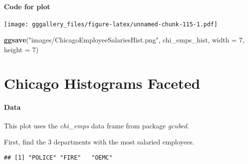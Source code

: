 \documentclass[]{book}
\newenvironment{Shaded}{\begin{snugshade}}{\end{snugshade}}
\newcommand{\DataTypeTok}[1]{\textcolor[rgb]{0.13,0.29,0.53}{#1}}
\newcommand{\DecValTok}[1]{\textcolor[rgb]{0.00,0.00,0.81}{#1}}
\newcommand{\KeywordTok}[1]{\textcolor[rgb]{0.13,0.29,0.53}{\textbf{#1}}}
\newcommand{\NormalTok}[1]{#1}
\newcommand{\OperatorTok}[1]{\textcolor[rgb]{0.81,0.36,0.00}{\textbf{#1}}}
\newcommand{\OtherTok}[1]{\textcolor[rgb]{0.56,0.35,0.01}{#1}}
\newcommand{\StringTok}[1]{\textcolor[rgb]{0.31,0.60,0.02}{#1}}
\begin{document}
\hypertarget{chihistcode}{%
\subsubsection*{Code for plot}\label{chihistcode}}

\texttt{[image: gggallery\_files/figure-latex/unnamed-chunk-115-1.pdf]}

\begin{Shaded}
\begin{Highlighting}[]
\KeywordTok{ggsave}\NormalTok{(}\StringTok{"images/ChicagoEmployeeSalariesHist.png"}\NormalTok{, chi_emps_hist, }\DataTypeTok{width =} \DecValTok{7}\NormalTok{, }\DataTypeTok{height =} \DecValTok{7}\NormalTok{)}
\end{Highlighting}
\end{Shaded}

\hypertarget{comphists}{%
\chapter*{Chicago Histograms Faceted}\label{comphists}}

\hypertarget{comphistsdata}{%
\subsubsection*{Data}\label{comphistsdata}}

This plot uses the \emph{chi\_emps} data frame from package \emph{gcubed}.

First, find the 3 departments with the most salaried employees.

\begin{Shaded}
\end{Shaded}

\begin{verbatim}
## [1] "POLICE" "FIRE"   "OEMC"
\end{verbatim}
\end{document}
